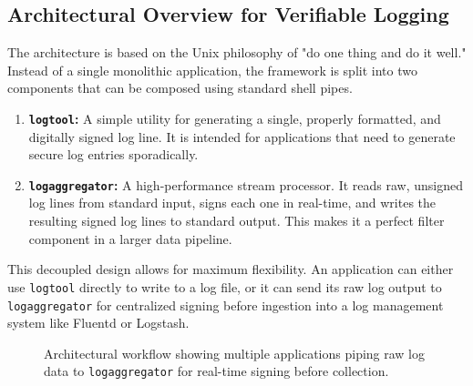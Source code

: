 \documentclass[12pt, letterpaper]{article}
\begin{document}
\subsection{Architectural Overview for Verifiable Logging}
The architecture is based on the Unix philosophy of "do one thing and do it well." Instead of a single monolithic application, the framework is split into two components that can be composed using standard shell pipes.
\begin{enumerate}
	\item \textbf{\texttt{logtool}:} A simple utility for generating a single, properly formatted, and digitally signed log line. It is intended for applications that need to generate secure log entries sporadically.
	\item \textbf{\texttt{logaggregator}:} A high-performance stream processor. It reads raw, unsigned log lines from standard input, signs each one in real-time, and writes the resulting signed log lines to standard output. This makes it a perfect filter component in a larger data pipeline.
\end{enumerate}
This decoupled design allows for maximum flexibility. An application can either use \texttt{logtool} directly to write to a log file, or it can send its raw log output to \texttt{logaggregator} for centralized signing before ingestion into a log management system like Fluentd or Logstash.

\begin{figure}[h!]
	\centering
	\caption{Architectural workflow showing multiple applications piping raw log data to \texttt{logaggregator} for real-time signing before collection.}
	\label{fig:log_arch}
\end{figure}
\end{document}
